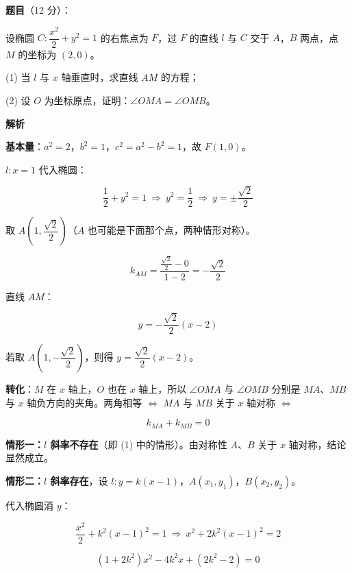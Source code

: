 \begin{answer}

\textbf{题目}（12 分）：

设椭圆 $C:\dfrac{x^{2}}2+y^{2}=1$ 的右焦点为 $F$，过 $F$ 的直线 $l$ 与 $C$ 交于 $A$，$B$ 两点，点 $M$ 的坐标为 $(2,0)$。

  (1) 当 $l$ 与 $x$ 轴垂直时，求直线 $AM$ 的方程；

  (2) 设 $O$ 为坐标原点，证明：$\angle OMA=\angle OMB$。

\textbf{解析}

\textbf{基本量}：$a^{2}=2$，$b^{2}=1$，$c^{2}=a^{2}-b^{2}=1$，故 $F(1,0)$。


$l:x=1$ 代入椭圆：

\nopagebreak[4]
\[\frac12+y^{2}=1\ \Longrightarrow\ y^{2}=\frac12\ \Longrightarrow\ y=\pm\frac{\sqrt2}2\]

取 $A\left(1,\dfrac{\sqrt2}2\right)$（$A$ 也可能是下面那个点，两种情形对称）。

\nopagebreak[4]
\[k_{AM}=\frac{\frac{\sqrt2}2-0}{1-2}=-\frac{\sqrt2}2\]

直线 $AM$：

\nopagebreak[4]
\[y=-\frac{\sqrt2}2(x-2)\]

若取 $A\left(1,-\dfrac{\sqrt2}2\right)$，则得 $y=\dfrac{\sqrt2}2(x-2)$。


\textbf{转化}：$M$ 在 $x$ 轴上，$O$ 也在 $x$ 轴上，所以 $\angle OMA$ 与 $\angle OMB$ 分别是 $MA$、$MB$ 与 $x$ 轴负方向的夹角。两角相等 $\iff$ $MA$ 与 $MB$ 关于 $x$ 轴对称 $\iff$

\nopagebreak[4]
\[k_{MA}+k_{MB}=0\]

\textbf{情形一：$l$ 斜率不存在}（即 (1) 中的情形）。由对称性 $A$、$B$ 关于 $x$ 轴对称，结论显然成立。

\textbf{情形二：$l$ 斜率存在}，设 $l:y=k(x-1)$，$A\left(x_1,y_1\right)$，$B\left(x_2,y_2\right)$。

代入椭圆消 $y$：

\nopagebreak[4]
\[\frac{x^{2}}2+k^{2}(x-1)^{2}=1\ \Longrightarrow\ x^{2}+2k^{2}(x-1)^{2}=2\]

\nopagebreak[4]
\[\left(1+2k^{2}\right)x^{2}-4k^{2}x+\left(2k^{2}-2\right)=0\]


\end{answer}
